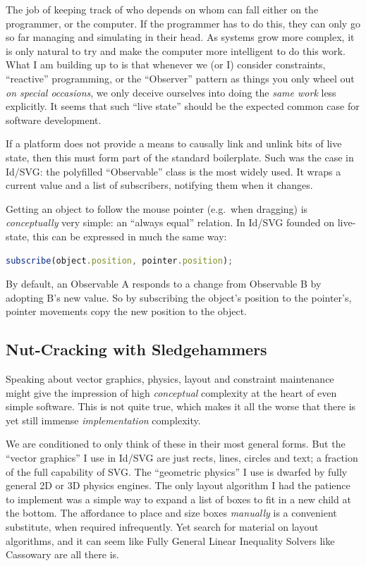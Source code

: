 The job of keeping track of who depends on whom can fall either on the
programmer, or the computer. If the programmer has to do this, they can
only go so far managing and simulating in their head. As systems grow
more complex, it is only natural to try and make the computer more
intelligent to do this work. What I am building up to is that whenever
we (or I) consider constraints, ``reactive'' programming, or the
``Observer'' pattern as things you only wheel out \emph{on special
occasions}, we only deceive ourselves into doing the \emph{same work}
less explicitly. It seems that such ``live state'' should be the
expected common case for software development.

If a platform does not provide a means to causally link and unlink bits
of live state, then this must form part of the standard boilerplate.
Such was the case in Id{}/SVG: the polyfilled ``Observable'' class is
the most widely used. It wraps a current value and a list of
subscribers, notifying them when it changes.

Getting an object to follow the mouse pointer (e.g.~when dragging) is
\emph{conceptually} very simple: an ``always equal'' relation. In
Id{}/SVG founded on live-state, this can be expressed in much the same
way:

\begin{lstlisting}[language=JavaScript, numbers=none]
subscribe(object.position, pointer.position);
\end{lstlisting}

By default, an Observable A responds to a change from Observable B by
adopting B's new value. So by subscribing the object's position to the
pointer's, pointer movements copy the new position to the object.

\hypertarget{nut-cracking-with-sledgehammers}{%
\subsection{Nut-Cracking with
Sledgehammers}\label{nut-cracking-with-sledgehammers}}

Speaking about vector graphics, physics, layout and constraint
maintenance might give the impression of high \emph{conceptual}
complexity at the heart of even simple software. This is not quite true,
which makes it all the worse that there is yet still immense
\emph{implementation} complexity.

We are conditioned to only think of these in their most general forms.
But the ``vector graphics'' I use in Id{}/SVG are just rects, lines,
circles and text; a fraction of the full capability of SVG. The
``geometric physics'' I use is dwarfed by fully general 2D or 3D physics
engines. The only layout algorithm I had the patience to implement was a
simple way to expand a list of boxes to fit in a new child at the
bottom. The affordance to place and size boxes \emph{manually} is a
convenient substitute, when required infrequently. Yet search for
material on layout algorithms, and it can seem like Fully General Linear
Inequality Solvers like Cassowary \cite{cassowary} are all there is.

